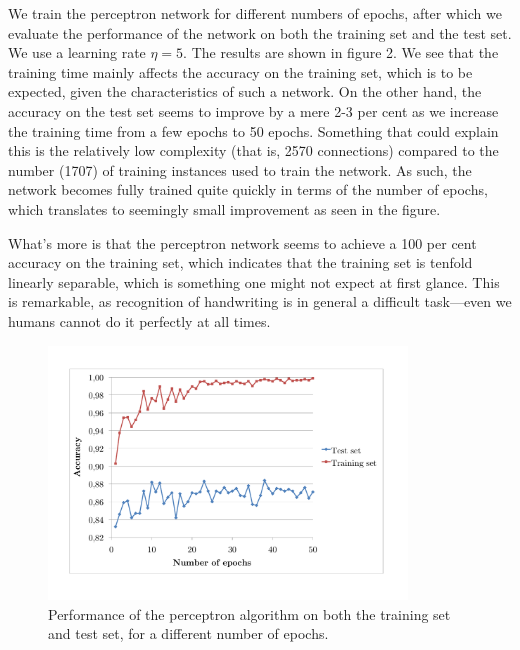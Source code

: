 \documentclass[11pt]{article}
\begin{document}
We train the perceptron network for different numbers of epochs, after which we evaluate the performance of the network on both the training set and the test set. We use a learning rate $\eta=5$. The results are shown in figure 2. We see that the training time mainly affects the accuracy on the training set, which is to be expected, given the characteristics of such a network. On the other hand, the accuracy on the test set seems to improve by a mere 2-3 per cent as we increase the training time from a few epochs to 50 epochs. Something that could explain this is the relatively low complexity (that is, 2570 connections) compared to the number (1707) of training instances used to train the network. As such, the network becomes fully trained quite quickly in terms of the number of epochs, which translates to seemingly small improvement as seen in the figure.\par
What's more is that the perceptron network seems to achieve a 100 per cent accuracy on the training set, which indicates that the training set is tenfold linearly separable, which is something one might not expect at first glance. This is remarkable, as recognition of handwriting is in general a difficult task---even we humans cannot do it perfectly at all times.
\begin{figure}[!t]
\centering
\includegraphics[width=0.85\textwidth]{O1_4_epochs.pdf}
\caption{Performance of the perceptron algorithm on both the training set and test set, for a different number of epochs.}
\end{figure}
\end{document}
